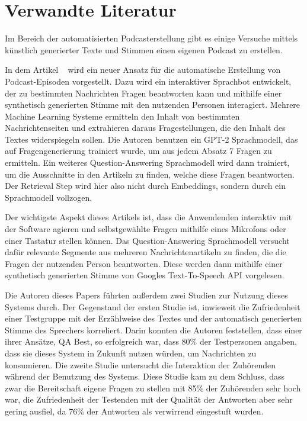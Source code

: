 \chapter{Verwandte Literatur}\label{ch:related_work}

Im Bereich der automatisierten Podcasterstellung gibt es einige Versuche mittels künstlich generierter Texte und Stimmen einen eigenen Podcast zu erstellen.

In dem Artikel ~\cite{laban2022} wird ein neuer Ansatz für die automatische Erstellung von Podcast-Episoden vorgestellt. 
Dazu wird ein interaktiver Sprachbot entwickelt, der zu bestimmten Nachrichten Fragen beantworten kann und mithilfe einer synthetisch generierten Stimme mit den nutzenden Personen interagiert.
Mehrere Machine Learning Systeme ermitteln den Inhalt von bestimmten Nachrichtenseiten und extrahieren daraus Fragestellungen, die den Inhalt des Textes widerspiegeln sollen. 
Die Autoren benutzen ein GPT-2 Sprachmodell, das auf Fragengenerierung trainiert wurde, um aus jedem Absatz 7 Fragen zu ermitteln. 
Ein weiteres Question-Answering Sprachmodell wird dann trainiert, um die Ausschnitte in den Artikeln zu finden, welche diese Fragen beantworten.  
Der Retrieval Step wird hier also nicht durch Embeddings, sondern durch ein Sprachmodell vollzogen.

Der wichtigste Aspekt dieses Artikels ist, dass die Anwendenden interaktiv mit der Software agieren und selbstgewählte Fragen mithilfe eines Mikrofons oder einer Tastatur stellen können.
Das Question-Answering Sprachmodell versucht dafür relevante Segmente aus mehreren Nachrichtenartikeln zu finden, die die Fragen der nutzenden Person beantworten.
Diese werden dann mithilfe einer synthetisch generierten Stimme von Googles Text-To-Speech API vorgelesen.

Die Autoren dieses Papers führten außerdem zwei Studien zur Nutzung dieses Systems durch.
Der Gegenstand der ersten Studie ist, inwieweit die Zufriedenheit einer Testgruppe mit der Erzählweise des Textes und der automatisch generierten Stimme des Sprechers korreliert. 
Darin konnten die Autoren feststellen, dass einer ihrer Ansätze, QA Best, so erfolgreich war, dass 80\% der Testpersonen angaben, dass sie dieses System in Zukunft nutzen würden, um Nachrichten zu konsumieren.
Die zweite Studie untersucht die Interaktion der Zuhörenden während der Benutzung des Systems. 
Diese Studie kam zu dem Schluss, dass zwar die Bereitschaft eigene Fragen zu stellen mit 85\% der Zuhörenden sehr hoch war, die Zufriedenheit der Testenden mit der Qualität der Antworten aber sehr gering ausfiel, da 76\% der Antworten als verwirrend eingestuft wurden.~\cite{laban2022}


